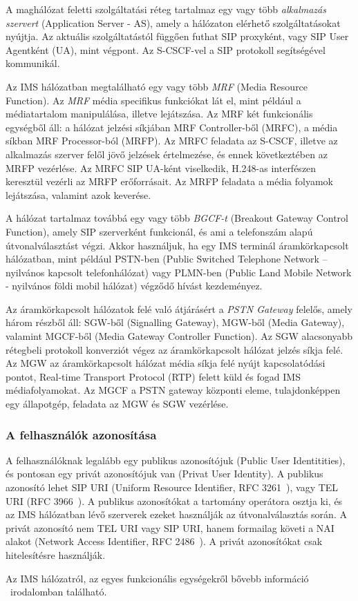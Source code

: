 A maghálózat feletti szolgáltatási réteg tartalmaz egy vagy több \emph{alkalmazás szervert} (Application Server - AS), amely a hálózaton elérhető szolgáltatásokat nyújtja. Az aktuális szolgáltatástól függően futhat SIP proxyként, vagy SIP User Agentként (UA), mint végpont. Az S-CSCF-vel a SIP protokoll segítségével kommunikál.

Az IMS hálózatban megtalálható egy vagy több \emph{MRF} (Media Resource Function). Az \emph{MRF} média specifikus funkciókat lát el, mint például a médiatartalom manipulálása, illetve lejátszása. Az MRF két funkcionális egységből áll: a hálózat jelzési síkjában MRF Controller-ből (MRFC), a média síkban MRF Processor-ból (MRFP).  Az MRFC feladata az S-CSCF, illetve az alkalmazás szerver felől jövő jelzések értelmezése, és ennek következtében az MRFP vezérlése. Az MRFC SIP UA-ként viselkedik, H.248-as interfészen keresztül vezérli az MRFP erőforrásait. Az MRFP feladata a média folyamok lejátszása, valamint azok keverése. 

A hálózat tartalmaz továbbá egy vagy több \emph{BGCF-t} (Breakout Gateway Control Function), amely SIP szerverként funkcionál, és ami a telefonszám alapú útvonalválasztást végzi. Akkor használjuk, ha egy IMS terminál áramkörkapcsolt hálózatban, mint például PSTN-ben (Public Switched Telephone Network – nyilvános kapcsolt telefonhálózat) vagy PLMN-ben (Public Land Mobile Network - nyilvános földi mobil hálózat) végződő hívást kezdeményez.

Az áramkörkapcsolt hálózatok felé való átjárásért a \emph{PSTN Gateway} felelős, amely három részből áll: SGW-ből (Signalling Gateway), MGW-ből (Media Gateway), valamint MGCF-ből (Media Gateway Controller Function). Az SGW alacsonyabb rétegbeli protokoll konverziót végez az áramkörkapcsolt hálózat jelzés síkja felé. Az MGW az áramkörkapcsolt hálózat média síkja felé nyújt kapcsolatódási pontot, Real-time Transport Protocol (RTP) felett küld és fogad IMS médiafolyamokat. Az MGCF a PSTN gateway központi eleme, tulajdonképpen egy állapotgép, feladata az MGW és SGW vezérlése.

\subsubsection{A felhasználók azonosítása}

A felhasználóknak legalább egy publikus azonosítójuk (Public User Identitities), és pontosan egy privát azonosítójuk van (Privat User Identity). A publikus azonosító lehet SIP URI (Uniform Resource Identifier, RFC 3261~\cite{rfc3261}), vagy TEL URI (RFC 3966~\cite{rfc3966}). A publikus azonosítókat a tartomány operátora osztja ki, és az IMS hálózatban lévő szerverek ezeket használják az útvonalválasztás során. A privát azonosító nem TEL URI vagy SIP URI, hanem formailag követi a NAI alakot (Network Access Identifier, RFC 2486~\cite{rfc2486}). A privát azonosítókat csak hitelesítésre használják.

\medskip

Az IMS hálózatról, az egyes funkcionális egységekről bővebb információ ~irodalomban található.

